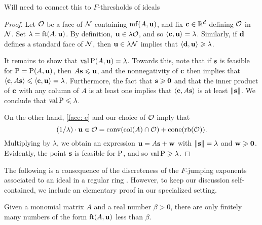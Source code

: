 \documentclass[11pt]{amsart}
\begin{document}
\alert[inline]{Will need to connect this to $F$-thresholds of ideals}

\begin{proof}
   Let $\mathcal{O}$ be a face of $\mathcal{N}$ containing $\operatorname{mf}(A,\mathbf{u})$, and fix $\mathbf{c} \in \mathbb{R}^d$ defining $\mathcal{O}$ in $\mathcal{N}$.
   Set $\lambda = \operatorname{ft}(A, \mathbf{u})$.
   By definition, $\mathbf{u} \in \lambda \mathcal{O}$, and so $\langle \mathbf{c}, \mathbf{u} \rangle = \lambda$.    Similarly, if $\mathbf{d}$ defines a standard face of $\mathcal{N}$, then $\mathbf{u} \in \lambda \mathcal{N}$ implies that $\langle \mathbf{d}, \mathbf{u} \rangle \geqslant \lambda$.

It remains to show that $\operatorname{val} \mathrm{P}(A, \mathbf{u}) = \lambda$.  Towards this, note that if $\mathbf{s}$ is feasible for $\mathrm{P} = \mathrm{P}(A, \mathbf{u})$, then $A \mathbf{s} \leqslant \mathbf{u}$, and the nonnegativity of $\mathbf{c}$ then implies that  $\langle \mathbf{c}, A \mathbf{s} \rangle \leqslant \langle \mathbf{c}, \mathbf{u} \rangle = \lambda$.  Furthermore, the fact that $\mathbf{s} \geqslant \mathbf{0}$ and that the inner product of $\mathbf{c}$ with any column of $A$ is at least one implies that $\langle \mathbf{c}, A \mathbf{s} \rangle$ is at least $\| \mathbf{s} \|$.  We conclude that $\operatorname{val} \mathrm{P} \leqslant \lambda$.  

On the other hand, \eqref{face: e} and our choice of $\mathcal{O}$ imply that 
\begin{equation}
\label{cone containment: e}
 (1/\lambda) \cdot \mathbf{u} \in \mathcal{O} = \operatorname{conv}(\operatorname{col}(A) \cap \mathcal{O}) + \operatorname{cone}(\operatorname{rb}(\mathcal{O})).
\end{equation}
Multiplying by $\lambda$, we obtain an expression $\mathbf{u} = A \mathbf{s} + \mathbf{w}$ with $\| \mathbf{s} \| = \lambda$ and $\mathbf{w} \geqslant \mathbf{0}$.
Evidently, the point $\mathbf{s}$ is feasible for $\mathrm{P}$, and so $\operatorname{val} \mathrm{P} \geqslant \lambda$.
\end{proof}


The following is a consequence of the discreteness of the $F$-jumping exponents associated to an ideal in a regular ring \cite[Theorem~3.1]{blickle+mustata+smith.discr_rat_FPTs}.
However, to keep our discussion self-contained, we include an elementary proof in our specialized setting.


\begin{lemma}
\label{discreteness: L}
Given a monomial matrix $A$ and a real number $\beta > 0 $, there are only finitely many numbers of the form $\operatorname{ft}(A, \mathbf{u})$ less than $\beta$.    
\end{lemma}
\end{document}
